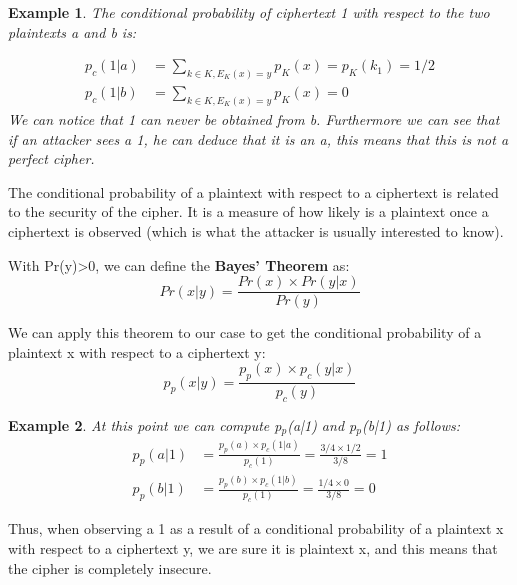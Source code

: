 \documentclass[a4paper, 12pt]{report}
\newtheorem{example}{\textbf{Example}}
\begin{document}
\begin{example}
	The conditional probability of ciphertext 1 with respect to the two plaintexts a and b is:
	
	\setcounter{equation}{0}
	\begin{align}
		p_c(1|a) &= \sum_{k\in K, E_K(x)=y}^{} p_K(x) = p_K(k_1) = 1/2 \\
		p_c(1|b) &= \sum_{k\in K, E_K(x)=y}^{} p_K(x) = 0		
	\end{align}
	We can notice that 1 can never be obtained from b. Furthermore we can see that if an attacker sees a 1, he can deduce that it is an a, this means that this is not a perfect cipher.
\end{example}

The conditional probability of a plaintext with respect to a ciphertext is related to the security of the cipher. It is a measure of how likely is a plaintext once a ciphertext is observed (which is what the attacker is usually interested to know).

With Pr(y)>0, we can define the \textbf{Bayes' Theorem} as:
\setcounter{equation}{0}
\begin{equation}
	Pr(x|y) = \frac{Pr(x) \times Pr(y|x)}{Pr(y)}
\end{equation}

We can apply this theorem to our case to get the conditional probability of a plaintext x with respect to a ciphertext y:
\setcounter{equation}{0}
\begin{equation}
	p_p(x|y) = \frac{p_p(x) \times p_c(y|x)}{p_c(y)}
\end{equation}

\begin{example}
	At this point we can compute p$_p$(a|1) and p$_p$(b|1) as follows:
	\setcounter{equation}{0}
	\begin{align}
	p_p(a|1) &= \frac{p_p(a) \times p_c(1|a)}{p_c(1)} = \frac{3/4 \times 1/2}{3/8} = 1\\
	p_p(b|1) &= \frac{p_p(b) \times p_c(1|b)}{p_c(1)} = \frac{1/4 \times 0}{3/8} = 0
	\end{align}
\end{example}
Thus, when observing a 1 as a result of a conditional probability of a plaintext x with respect to a ciphertext y, we are sure it is plaintext x, and this means that the cipher is completely insecure.
\end{document}
